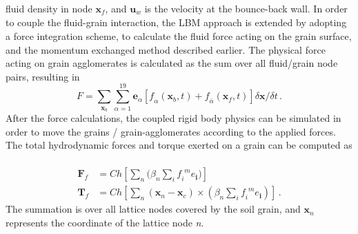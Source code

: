 fluid density in node $\mathbf{x}_{\mathit{f}}$, and $ \mathbf{u}_{\mathit{w}}  
$ is the velocity at the bounce-back wall. In order to couple the 
fluid-grain interaction, the LBM approach is extended by adopting a force 
integration scheme, to calculate the fluid force acting on the grain surface, 
and the momentum exchanged method described earlier. The physical force acting 
on grain agglomerates is calculated as the sum over all fluid/grain node 
pairs, resulting in
%
\begin{equation}
\mathit{F} = 
\sum\limits_{\mathbf{x}_{b}}\sum\limits_{\alpha=1}^{19}{\mathbf{e}_{\alpha}
	[\mathit{f}_{\alpha}(\mathbf{x}_{b},t)
		+\mathit{f}_{\overline{\alpha}}(\mathbf{x}_{f},t)]
 				\delta \mathbf{x} / \delta t}\,.
\end{equation}
%
After the force calculations, the coupled rigid body physics can be simulated 
in order to move the grains / grain-agglomerates according to the applied 
forces. The total hydrodynamic forces and torque exerted on a grain can be 
computed as ~\citep{Cook2004, Noble1998}
%
\begin{align}
\mathbf{F}_{f} & = \mathit{Ch}[\sum\limits_{\mathit{n}}{(\beta_{\mathit{n}} 
\sum\limits_{\mathit{i}}{\mathit{f_i}^{\mathit{ m}}\mathbf{\mathit{e}_i}}})] \\ 
\mathbf{T}_{f} & = 
\mathit{Ch}[\sum\limits_{\mathit{n}}{(\mathbf{x}_{\mathit{n}}-\mathbf{x}_{\mathit{c}})
 \times (\beta_{\mathit{n}} \sum\limits_{\mathit{i}}{\mathit{f_i}^{\mathit{ 
m}}\mathbf{\mathit{e}_i}})}]\,.
\end{align}
%
The summation is over all lattice nodes covered by the soil grain, and 
$\mathbf{x}_{\mathit{n}}$ represents the coordinate of the lattice node 
\textit{n}.
%
